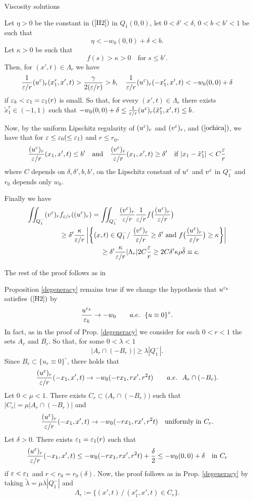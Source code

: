 \begin{section}{Viscosity solutions}
\begin{pf}
Let $\eta>0$ be the constant in $(\ref{H2})$ in $Q_1(0,0)$, let
$0<\delta'<\delta$, $0<b<b'<1$ be such that
$$
\eta< -w_0(0,0)+\delta<b.
$$
Let $\kappa>0$ be such that
$$f(s)>\kappa>0\quad \mbox{for } s\le b'.$$
Then, for $(x',t)\in\Lambda_r$ we have
$$\frac{1}{\varepsilon/r}(u^\varepsilon)_r(x_1^r,x',t)>\frac{\gamma}{2(\varepsilon/r)}>b,\quad
\frac{1}{\varepsilon/r}(u^\varepsilon)_r(-x_1^r,x',t)< -w_0(0,0)+\delta$$
if $\varepsilon_k<\varepsilon_1=\varepsilon_1(r)$ is small.
 So that, for
every $(x',t)\in \Lambda_r$ there exists $\tilde x_1^r\in(-1,1)$ such that
$-w_0(0,0)
+\delta\le\frac1{\varepsilon/r}(u^\varepsilon)_r(\tilde x_1^r,x',t)\le b$.

Now, by the uniform Lipschitz regularity of $(u^\varepsilon)_r$ and $(v^\varepsilon)_r$,  and
$(\ref{ochica})$,
we have that for $\varepsilon\le\varepsilon_0(\le\varepsilon_1)$ and $r\le r_0$,
$$
\frac{(u^\varepsilon)_r}{\varepsilon/r}(x_1,x',t)\le b'\quad
\mbox{and}\quad\frac{(v^\varepsilon)_r}{\varepsilon/r}
(x_1,x',t)\ge \delta'
\quad \mbox{if }
|x_1-\tilde x_1^r|<C\frac{\varepsilon}{r}
$$
where $C$ depends on $\delta,\delta',b,b'$, on the Lipschitz constant of 
$u^\varepsilon$ and $v^\varepsilon$ in $Q_1^-$  and $r_0$ depends only $w_0$.

Finally we have
\begin{align*}
\iint_{Q_1^-}(v^\varepsilon)_r &f_{\varepsilon/r}((u^\varepsilon)_r)=
\iint_{Q_1^-}\frac{(v^\varepsilon)_r}{\varepsilon/r}\frac1{\varepsilon/r}f\big(
\frac{(u^\varepsilon)_r}{\varepsilon/r}\big)\\
&\ge \delta'\frac{\kappa}{\varepsilon/r}
\left|\left\{(x,t)\in Q_1^-/\ \frac{(v^\varepsilon)_r}{\varepsilon/r}\ge\delta'\mbox{ and }
f\big(\frac{(u^\varepsilon)_r}{\varepsilon/r}\big)\ge \kappa\right\}\right|\\
&\qquad\qquad\qquad\ge\delta'\frac{\kappa}{\varepsilon/r}|\Lambda_r|2C\frac{\varepsilon}{r}\ge
2C\delta'\kappa\rho\tilde{\delta}\equiv c.
\end{align*}

The rest of the proof follows as in \cite{CLW1}
\end{pf}

\begin{rem}
\label{otrodegen}
 Proposition \ref{degeneracy} remains true if we change the 
hypothesis that $u^{\varepsilon_k}$ satisfies $(\ref{H2})$ by 
\begin{equation}
\label{H3}
\frac{u^{\ve_k}}{\ve_k}\to -w_0\qquad a.e. \ \ \{u\equiv0\}^\circ.
\end{equation}
In fact, as in the proof of Prop. \ref{degeneracy} we consider for each
$0<r<1$ the sets $A_r$ and $B_r$. So that, for some $0<\lambda<1$
$$
|A_r\cap(-B_r)|\ge\lambda |Q_1^-|.
$$
Since $B_r\subset\{u_r\equiv0\}^\circ$, there holds that
$$
\frac{(u^\varepsilon)_r}{\varepsilon/r}(-x_1,x',t)\to -w_0(-r{x_1},rx',r^2t)\qquad a.e. \ \ A_r\cap(-B_r).
$$
Let $0<\mu<1$. There exists $C_r\subset \big(A_r\cap(-B_r)\big)$ such that
$|C_r|=\mu|A_r\cap(-B_r)|$ and 
$$
\frac{(u^\varepsilon)_r}{\varepsilon/r}(-x_1,x',t)\to -w_0(-rx_1,rx',r^2t)\quad\mbox{uniformly in }C_r.
$$
Let $\delta>0$. There exists $\varepsilon_1=\varepsilon_1(r)$ such that
$$
\frac{(u^\varepsilon)_r}{\varepsilon/r}(-x_1,x',t)\le -w_0(-rx_1,rx',r^2t)+\frac\delta2\le
-w_0(0,0)+\delta\quad\mbox{in }C_r
$$
if $\varepsilon<\varepsilon_1$ and $r<r_0= r_0(\delta)$.
Now, the proof follows as in Prop. \ref{degeneracy} by taking $\tilde\lambda=
\mu\lambda|Q_1^-|$ and 
$$
\Lambda_r:=\{(x',t)\,/\,(x_1^r,x',t)\in C_r\}.
$$
\end{rem}



\end{section}
